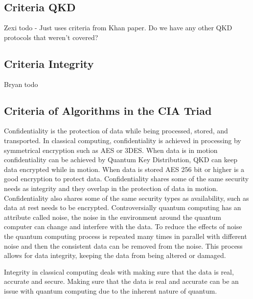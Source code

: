 \documentclass[sigconf]{acmart}
\begin{document}
\subsection{Criteria QKD}
Zexi todo - Just uses criteria from Khan paper. Do we have any other QKD protocols that weren't covered?

\subsection{Criteria Integrity}
Bryan todo

\subsection{Criteria of Algorithms in the CIA Triad} %
Confidentiality is the protection of data while being processed, stored, and transported. %
In classical computing, confidentiality is achieved in processing by symmetrical encryption such as AES or 3DES.
When data is in motion confidentiality can be achieved by Quantum Key Distribution, QKD can keep data encrypted while in motion. %
When data is stored AES 256 bit or higher is a good encryption to protect data. Confidentiality shares some of the same security needs as integrity and they overlap in the protection of data in motion. Confidentiality also shares some of the same security types as availability, such as data at rest needs to be encrypted. Controversially quantum computing has an attribute called noise, the noise in the environment around the quantum computer can change and interfere with the data. To reduce the effects of noise the quantum computing process is repeated many times in parallel with different noise and then the consistent data can be removed from the noise. This process allows for data integrity, keeping the data from being altered or damaged. %

Integrity in classical computing deals with making sure that the data is real, accurate and secure. Making sure that the data is real and accurate can be an issue with quantum computing due to the inherent nature of quantum. 
\end{document}
